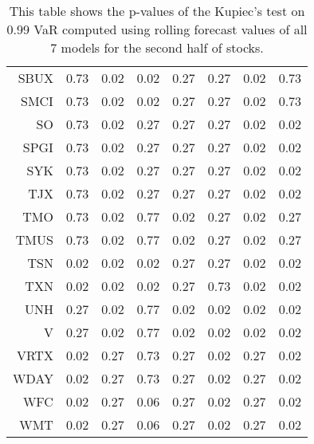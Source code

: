 \begin{table}[ht]
\begin{tabular}{rrrrrrrr}
  SBUX & 0.73 & 0.02 & 0.02 & 0.27 & 0.27 & 0.02 & 0.73 \\ 
  SMCI & 0.73 & 0.02 & 0.02 & 0.27 & 0.27 & 0.02 & 0.73 \\ 
  SO & 0.73 & 0.02 & 0.27 & 0.27 & 0.27 & 0.02 & 0.02 \\ 
  SPGI & 0.73 & 0.02 & 0.27 & 0.27 & 0.27 & 0.02 & 0.02 \\ 
  SYK & 0.73 & 0.02 & 0.27 & 0.27 & 0.27 & 0.02 & 0.02 \\ 
  TJX & 0.73 & 0.02 & 0.27 & 0.27 & 0.27 & 0.02 & 0.02 \\ 
  TMO & 0.73 & 0.02 & 0.77 & 0.02 & 0.27 & 0.02 & 0.27 \\ 
  TMUS & 0.73 & 0.02 & 0.77 & 0.02 & 0.27 & 0.02 & 0.27 \\ 
  TSN & 0.02 & 0.02 & 0.02 & 0.27 & 0.27 & 0.02 & 0.02 \\ 
  TXN & 0.02 & 0.02 & 0.02 & 0.27 & 0.73 & 0.02 & 0.02 \\ 
  UNH & 0.27 & 0.02 & 0.77 & 0.02 & 0.02 & 0.02 & 0.02 \\ 
  V & 0.27 & 0.02 & 0.77 & 0.02 & 0.02 & 0.02 & 0.02 \\ 
  VRTX & 0.02 & 0.27 & 0.73 & 0.27 & 0.02 & 0.27 & 0.02 \\ 
  WDAY & 0.02 & 0.27 & 0.73 & 0.27 & 0.02 & 0.27 & 0.02 \\ 
  WFC & 0.02 & 0.27 & 0.06 & 0.27 & 0.02 & 0.27 & 0.02 \\ 
  WMT & 0.02 & 0.27 & 0.06 & 0.27 & 0.02 & 0.27 & 0.02 \\ 
   \hline
\end{tabular}
\caption[Kupiec's test p-values, alpha =0.99 (2)]{This table shows the p-values of the Kupiec's test on 0.99 VaR computed using rolling forecast values of all 7 models for the second half of stocks.} 
\label{Table:Kupiec_test_rolling_0.99_2}
\end{table}
